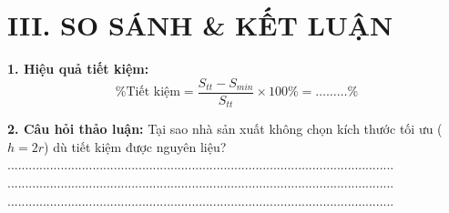 \documentclass[12pt,a4paper]{article}
\begin{document}
\section*{\color{ecogreen} III. SO SÁNH & KẾT LUẬN}

\textbf{1. Hiệu quả tiết kiệm:}
$$ \% \text{Tiết kiệm} = \frac{S_{tt} - S_{min}}{S_{tt}} \times 100\% = \dots\dots\dots \% $$

\textbf{2. Câu hỏi thảo luận:}
Tại sao nhà sản xuất không chọn kích thước tối ưu ($h=2r$) dù tiết kiệm được nguyên liệu?
.............................................................................................................
.............................................................................................................
.............................................................................................................
\end{document}
